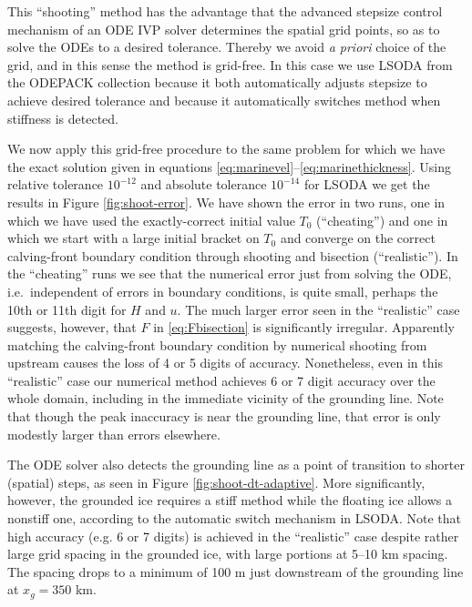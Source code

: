 \documentclass[twocolumn,letterpaper]{igs}
\begin{document}
This ``shooting'' method has the advantage that the advanced stepsize control mechanism of an ODE IVP solver determines the spatial grid points, so as to solve the ODEs to a desired tolerance.  Thereby we avoid \emph{a priori} choice of the grid, and in this sense the method is grid-free.  In this case we use LSODA from the ODEPACK collection \citep{Hindmarsh1983ODEPACK} because it both automatically adjusts stepsize to achieve desired tolerance and because it automatically switches method when stiffness \citep[section 16.6]{Pressetal} is detected.

We now apply this grid-free procedure to the same problem for which we have the exact solution given in equations \eqref{eq:marinevel}--\eqref{eq:marinethickness}.  Using relative tolerance $10^{-12}$ and absolute tolerance $10^{-14}$ for LSODA we get the results in Figure \ref{fig:shoot-error}.  We have shown the error in two runs, one in which we have used the exactly-correct initial value $T_0$ (``cheating'') and one in which we start with a large initial bracket on $T_0$ and converge on the correct calving-front boundary condition through shooting and bisection (``realistic'').  In the ``cheating'' runs we see that the numerical error just from solving the ODE, i.e.~independent of errors in boundary conditions, is quite small, perhaps the 10th or 11th digit for $H$ and $u$.  The much larger error seen in the ``realistic'' case suggests, however, that $F$ in \eqref{eq:Fbisection} is significantly irregular.  Apparently matching the calving-front boundary condition by numerical shooting from upstream causes the loss of 4 or 5 digits of accuracy.  Nonetheless, even in this ``realistic'' case our numerical method achieves 6 or 7 digit accuracy over the whole domain, including in the immediate vicinity of the grounding line.  Note that though the peak inaccuracy is near the grounding line, that error is only modestly larger than errors elsewhere.

The ODE solver also detects the grounding line as a point of transition to shorter (spatial) steps, as seen in Figure \ref{fig:shoot-dt-adaptive}.  More significantly, however, the grounded ice requires a stiff method while the floating ice allows a nonstiff one, according to the automatic switch mechanism in LSODA.  Note that high accuracy (e.g. 6 or 7 digits) is achieved in the ``realistic'' case despite rather large grid spacing in the grounded ice, with large portions at 5--10 km spacing.  The spacing drops to a minimum of 100 m just downstream of the grounding line at $x_g=350$ km.
\end{document}
